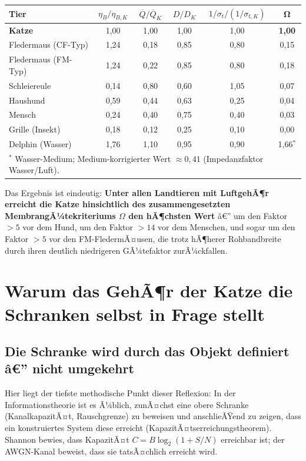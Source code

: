 ﻿\documentclass[12pt,a4paper,titlepage]{report}
\begin{document}
\begin{center}
\renewcommand{\arraystretch}{1.45}
\begin{tabular}{lccccc}
\toprule
\textbf{Tier} & $\eta_B / \eta_{B,K}$ & $\overline{Q}/\overline{Q}_K$ &
$D/D_K$ & $1/\sigma_t / (1/\sigma_{t,K})$ & $\mathbf{\Omega}$ \\
\midrule
\textbf{Katze}        & 1{,}00 & 1{,}00 & 1{,}00 & 1{,}00 & \textbf{1{,}00} \\
Fledermaus (CF-Typ)   & 1{,}24 & 0{,}18 & 0{,}85 & 0{,}80 & 0{,}15 \\
Fledermaus (FM-Typ)   & 1{,}24 & 0{,}22 & 0{,}85 & 0{,}80 & 0{,}18 \\
Schleiereule          & 0{,}14 & 0{,}80 & 0{,}60 & 1{,}05 & 0{,}07 \\
Haushund              & 0{,}59 & 0{,}44 & 0{,}63 & 0{,}25 & 0{,}04 \\
Mensch                & 0{,}24 & 0{,}40 & 0{,}75 & 0{,}40 & 0{,}03 \\
Grille (Insekt)       & 0{,}18 & 0{,}12 & 0{,}25 & 0{,}10 & 0{,}00 \\
Delphin (Wasser)      & 1{,}76 & 1{,}10 & 0{,}95 & 0{,}90 & 1{,}66$^*$ \\
\bottomrule
\multicolumn{6}{l}{\footnotesize $^*$ Wasser-Medium; Medium-korrigierter Wert $\approx 0{,}41$ (Impedanzfaktor Wasser/Luft).}
\end{tabular}
\end{center}

Das Ergebnis ist eindeutig:
\textbf{Unter allen Landtieren mit LuftgehÃ¶r erreicht die Katze hinsichtlich des
zusammengesetzten MembrangÃ¼tekriteriums $\Omega$ den hÃ¶chsten Wert} â€” um den
Faktor $> 5$ vor dem Hund, um den Faktor $> 14$ vor dem Menschen, und sogar
um den Faktor $> 5$ vor den FM-FledermÃ¤usen, die trotz hÃ¶herer Rohbandbreite durch
ihren deutlich niedrigeren GÃ¼tefaktor zurÃ¼ckfallen.

\section{Warum das GehÃ¶r der Katze die Schranken selbst in Frage stellt}

\subsection{Die Schranke wird durch das Objekt definiert â€” nicht umgekehrt}

Hier liegt der tiefste methodische Punkt dieser Reflexion:
In der Informationstheorie ist es Ã¼blich, zunÃ¤chst eine obere Schranke
(KanalkapazitÃ¤t, Rauschgrenze) zu beweisen und anschlieÃŸend zu zeigen,
dass ein konstruiertes System diese erreicht (KapazitÃ¤tserreichungstheorem).
Shannon bewies, dass KapazitÃ¤t $C = B\log_2(1 + S/N)$ erreichbar ist;
der AWGN-Kanal beweist, dass sie tatsÃ¤chlich erreicht wird.
\end{document}
